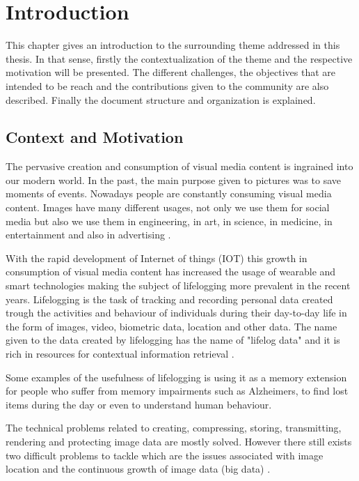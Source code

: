 \cleardoublepage

\chapter{Introduction}
\label{ch:introduction}
This chapter gives an introduction to the surrounding theme addressed in this thesis. In that sense, firstly the contextualization of the theme and the respective motivation will be presented. The different challenges, the objectives that are intended to be reach and the contributions given to the community are also described. Finally the document structure and organization is explained.


\section{Context and Motivation}

The pervasive creation and consumption of visual media content is ingrained into our modern world. In the past, the main purpose given to pictures was to save moments of events. Nowadays people are constantly consuming visual media content. Images have many different usages, not only we use them for social media but also we use them in engineering, in art, in science, in medicine, in entertainment and also in advertising \cite{Zhang2008}.



With the rapid development of Internet of things (IOT) this growth in consumption of visual media content has increased the usage of wearable and smart technologies making the subject of lifelogging more prevalent in the recent years. Lifelogging is the task of tracking and recording personal data created trough the activities and behaviour of individuals during their day-to-day life in the form of images, video, biometric data, location and other data. The name given to the data created by lifelogging has the name of "lifelog data" and it is rich in resources for contextual information retrieval \cite{Ribeiro}.

Some examples of the usefulness of lifelogging is using it as a memory extension for people who suffer from memory impairments such as Alzheimers, to find lost items during the day or even to understand human behaviour.


The technical problems related to creating, compressing, storing, transmitting, rendering and protecting image data are mostly solved. However there still exists two difficult problems to tackle which are the issues associated with image location and the continuous growth of image data (big data) \cite{Zhang2008}.

